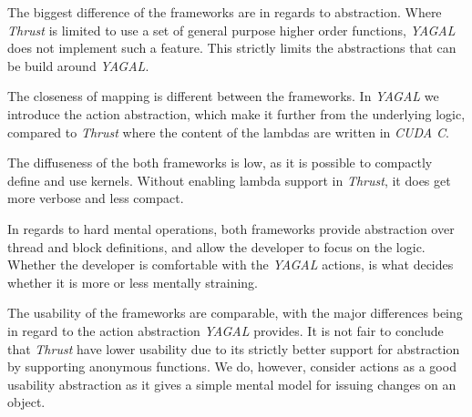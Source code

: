 The biggest difference of the frameworks are in regards to abstraction. Where \textit{Thrust} is limited to use a set of general purpose higher order functions, \textit{YAGAL} does not implement such a feature. This strictly limits the abstractions that can be build around \textit{YAGAL}.

The closeness of mapping is different between the frameworks. In \textit{YAGAL} we introduce the action abstraction, which make it further from the underlying logic, compared to \textit{Thrust} where the content of the lambdas are written in \textit{CUDA C}.

The diffuseness of the both frameworks is low, as it is possible to compactly define and use kernels. Without enabling lambda support in \textit{Thrust}, it does get more verbose and less compact.

In regards to hard mental operations, both frameworks provide abstraction over thread and block definitions, and allow the developer to focus on the logic. Whether the developer is comfortable with the \textit{YAGAL} actions, is what decides whether it is more or less mentally straining.

The usability of the frameworks are comparable, with the major differences being in regard to the action abstraction \textit{YAGAL} provides. It is not fair to conclude that \textit{Thrust} have lower usability due to its strictly better support for abstraction by supporting anonymous functions. We do, however, consider actions as a good usability abstraction as it gives a simple mental model for issuing changes on an object.